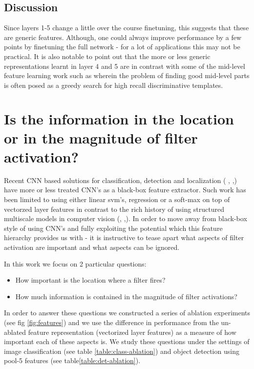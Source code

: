 \documentclass[runningheads]{llncs}
\begin{document}
\subsection{Discussion}
\label{sub:fine-discussion}
Since layers 1-5 change a little over the course finetuning, this suggests that these are generic features. Although, one could always improve performance by a few points by finetuning the full network - for a lot of applications this may not be practical. 
It is also notable to point out that the more or less generic representations learnt in layer 4 and 5 are in contrast with some of the mid-level feature learning work such as \cite{Blocks} \cite{Mid1} wherein the problem of finding good mid-level parts is often posed as a greedy search for high recall discriminative templates.


\section{Is the information in the location or in the magnitude of filter activation?}
\label{sec-where-info}
Recent CNN based solutions for  classification, detection and localization ( \cite{overfeat}, \cite{Decaf},\cite{Rcnn}) have more or less treated CNN's as a black-box feature extractor. Such work has been limited to using either linear svm's, regression or a soft-max on top of vectorzed layer features in contrast to the rich history of using structured multiscale models in computer vision (\cite{DPM}, \cite{YangRamanan},\cite{Poselets}). In order to move away from black-box style of using CNN's and fully exploiting the potential which this feature hierarchy provides us with - it is instructive to tease apart what aspects of filter activation are important and what aspects can be ignored. 

In this work we focus on 2 particular questions:
\begin{itemize}
\item How important is the location where a filter fires?
\item How much information is contained in the magnitude of filter activations?
\end{itemize}

In order to answer these questions we constructed a series of ablation experiments (see fig \ref{fig:features}) and we use the difference in performance from the un-ablated feature representation (vectorized layer features) as a measure of how important each of these aspects is. We study these questions under the  settings of image classification (see table \ref{table:class-ablation}) and object detection using pool-5 features (see table\ref{table:det-ablation}). 
\end{document}
